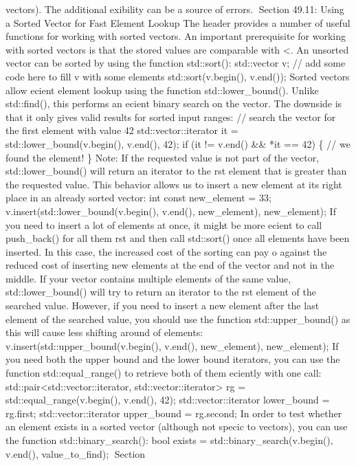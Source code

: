 vectors). The additional exibility can be a source of errors. Section
49.11: Using a Sorted Vector for Fast Element Lookup The header provides
a number of useful functions for working with sorted vectors. An
important prerequisite for working with sorted vectors is that the
stored values are comparable with \textless. An unsorted vector can be
sorted by using the function std::sort(): std::vector v; // add some
code here to fill v with some elements std::sort(v.begin(), v.end());
Sorted vectors allow ecient element lookup using the function
std::lower\_bound(). Unlike std::find(), this performs an ecient binary
search on the vector. The downside is that it only gives valid results
for sorted input ranges: // search the vector for the first element with
value 42 std::vector::iterator it = std::lower\_bound(v.begin(),
v.end(), 42); if (it != v.end() \&\& *it == 42) \{ // we found the
element! \} Note: If the requested value is not part of the vector,
std::lower\_bound() will return an iterator to the rst element that is
greater than the requested value. This behavior allows us to insert a
new element at its right place in an already sorted vector: int const
new\_element = 33; v.insert(std::lower\_bound(v.begin(), v.end(),
new\_element), new\_element); If you need to insert a lot of elements at
once, it might be more ecient to call push\_back() for all them rst and
then call std::sort() once all elements have been inserted. In this
case, the increased cost of the sorting can pay o against the reduced
cost of inserting new elements at the end of the vector and not in the
middle. If your vector contains multiple elements of the same value,
std::lower\_bound() will try to return an iterator to the rst element of
the searched value. However, if you need to insert a new element after
the last element of the searched value, you should use the function
std::upper\_bound() as this will cause less shifting around of elements:
v.insert(std::upper\_bound(v.begin(), v.end(), new\_element),
new\_element); If you need both the upper bound and the lower bound
iterators, you can use the function std::equal\_range() to retrieve both
of them eciently with one call:
std::pair\textless std::vector::iterator,
std::vector::iterator\textgreater{} rg = std::equal\_range(v.begin(),
v.end(), 42); std::vector::iterator lower\_bound = rg.first;
std::vector::iterator upper\_bound = rg.second; In order to test whether
an element exists in a sorted vector (although not specic to vectors),
you can use the function std::binary\_search(): bool exists =
std::binary\_search(v.begin(), v.end(), value\_to\_find); Section
